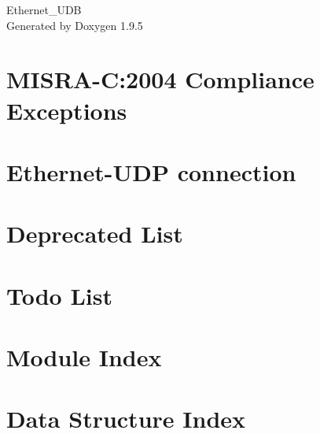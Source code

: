 \documentclass[twoside]{book}
\newcommand{\+}{\discretionary{\mbox{\scriptsize$\hookleftarrow$}}{}{}}
\newcommand{\clearemptydoublepage}{%
    \newpage{\pagestyle{empty}\cleardoublepage}%
  }
\begin{document}
  \raggedbottom
    \hypersetup{pageanchor=false,
                bookmarksnumbered=true,
                pdfencoding=unicode
               }
  \begin{titlepage}
  \vspace*{7cm}
  \begin{center}%
  {\Large Ethernet\+\_\+\+UDB}\\
  \vspace*{1cm}
  {\large Generated by Doxygen 1.9.5}\\
  \end{center}
  \end{titlepage}
  \clearemptydoublepage
  \tableofcontents
  \clearemptydoublepage
  \hypersetup{pageanchor=true}
\chapter{MISRA-\/C\+:2004 Compliance Exceptions}
\label{_c_m_s_i_s__m_i_s_r_a__exceptions}

\chapter{Ethernet-\/\+UDP connection}
\label{md__c___users__user_4__s_t_m32_cube_i_d_e_workspace_1_10_1_ethernet__u_d_b_readme}

\chapter{Deprecated List}
\label{deprecated}

\chapter{Todo List}
\label{todo}

\chapter{Module Index}

\chapter{Data Structure Index}

\end{document}
